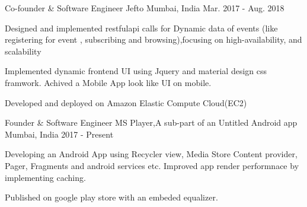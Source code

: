 

\begin{cventries}
  
  \cventry
    {Co-founder \& Software Engineer} %
    {Jefto} %
    {Mumbai, India} %
    {Mar. 2017 - Aug. 2018} %
    {
      \begin{cvitems} %
        \item {Designed and implemented restful\-api calls for Dynamic data of events (like registering for event , subscribing and browsing),focusing on high-availability, and scalability }
        \item {Implemented dynamic frontend UI using Jquery and material design css framwork. Achived a Mobile App look  like UI on mobile.   }
        \item {Developed  and deployed on Amazon Elastic Compute Cloud(EC2) }
      \end{cvitems}
    }

\end{cventries}



\begin{cventries}

  \cventry
    {Founder \& Software Engineer} %
    {MS Player,A sub-part of an Untitled Android app} %
    {Mumbai, India} %
    { 2017 - Present} %
    {
      \begin{cvitems} %
        \item {Developing an Android App using Recycler view, Media Store Content provider, Pager, Fragments and android services etc. Improved app render performnace by implementing caching. }
        \item {Published on google play store with an embeded equalizer. }
      \end{cvitems}
    }


\end{cventries}

